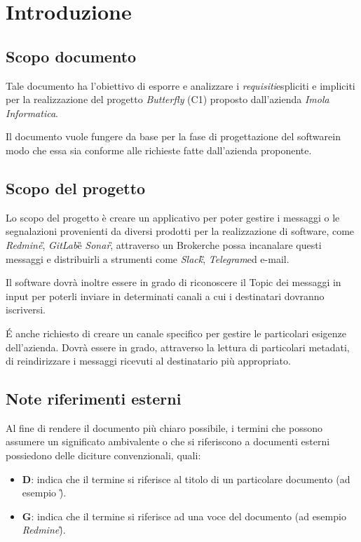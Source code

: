 \section{Introduzione}

	\subsection{Scopo documento}
	Tale documento ha l'obiettivo di esporre e analizzare i \textit{requisiti}\GAlt espliciti e impliciti per la realizzazione del progetto \textit{Butterfly} (C1) proposto dall'azienda \textit{Imola Informatica}.
	
	Il documento vuole fungere da base per la fase di progettazione del software\GAlt in modo che essa sia conforme alle richieste fatte dall'azienda proponente.
	
	\subsection{Scopo del progetto}
	Lo scopo del progetto è creare un applicativo per poter gestire i messaggi o le segnalazioni provenienti da diversi prodotti per la realizzazione di software, come \textit{Redmine}\G, \textit{GitLab}\G e \textit{Sonar}\G, attraverso un Broker\GAlt che possa incanalare questi messaggi e distribuirli a strumenti come \textit{Slack}\G, \textit{Telegram}\GAlt ed e-mail.
	
	Il software dovrà inoltre essere in grado di riconoscere il Topic dei messaggi in input per poterli inviare in determinati canali a cui i destinatari dovranno iscriversi.
	
	\'E anche richiesto di creare un canale specifico per gestire le particolari esigenze dell'azienda. Dovrà essere in grado, attraverso la lettura di particolari metadati\GAlt, di reindirizzare i messaggi ricevuti al destinatario più appropriato.
	
	\subsection{Note riferimenti esterni}
	Al fine di rendere il documento più chiaro possibile, i termini che possono assumere un significato ambivalente o che si riferiscono a documenti esterni possiedono delle diciture convenzionali, quali:
	
	\begin{itemize}
		\item \textbf{D}: indica che il termine si riferisce al titolo di un particolare documento (ad esempio \textit{\PdPv}\G).
		\item \textbf{G}: indica che il termine si riferisce ad una voce del documento \textit{\Gl} (ad esempio \textit{Redmine}\G).
	\end{itemize}

